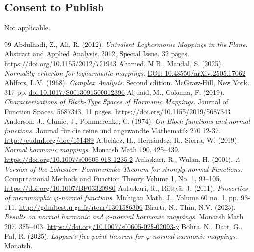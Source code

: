 \documentclass[11pt, reqno]{amsart}
\theoremstyle{definition}
\theoremstyle{remark}
\numberwithin{equation}{section}
\begin{document}
\subsection*{Consent to Publish} Not applicable.

\begin{thebibliography}{99}
 \label{abdulhadi-ulmitp-2012} Abdulhadi, Z., Ali, R. (2012). \textit{Univalent Logharmonic Mappings in the Plane}. Abstract and Applied Analysis. 2012, Special Issue. 32 pages. \url{https://doi.org/10.1155/2012/721943}
 \label{ahamed-ncflm-2025} Ahamed, M.B., Mandal, S. (2025). \textit{Normality criterion for logharmonic mappings}. \url{DOI: 10.48550/arXiv.2505.17062}
 \label{ahlfors-ca-1968} Ahlfors, L.V. (1968). \textit{Complex Analysis}. Second edition. McGraw-Hill, New York. 317 pp. \url{doi:10.1017/S0013091500012396}
 \label{aljuain-cobtsohm-2019} Aljuaid, M., Colonna, F. (2019). \textit{Characterizations of Bloch-Type Spaces of Harmonic Mappings}. Journal of Function Spaces. 5687343, 11 pages. \url{https://doi.org/10.1155/2019/5687343}
 \label{anderson-obfanf-1974} Anderson, J., Clunie, J., Pommerenke, C. (1974). \textit{On Bloch functions and normal functions.} Journal für die reine und angewandte Mathematik 270 12-37. \url{http://eudml.org/doc/151489}
 \label{arbelaez-nhm-2019} Arbeláez, H., Hernández, R., Sierra, W. (2019). \textit{Normal harmonic mappings}. Monatsh Math 190, 425–439. \url{https://doi.org/10.1007/s00605-018-1235-2}
 \label{aulaskari-avotlptfsnf-2001} Aulaskari, R., Wulan, H. (2001). \textit{A Version of the Lohwater\,-\,Pommerenke Theorem for strongly-normal Functions}. Computational Methods and Function Theory Volume 1, No. 1, 99–105. \url{https://doi.org/10.1007/BF03320980}
 \label{aulaskari-pompnf-2011} Aulaskari, R., Rättyä, J. (2011). \textit{Properties of meromorphic $\varphi$-normal functions}. Michigan Math. J., Volume 60 no. 1, pp. 93-111. \url{http://gdmltest.u-ga.fr/item/1301586306}
 \label{bharti-ronhapnhm-2025} Bharti, N., Thin, N.V. (2025). \textit{Results on normal harmonic and 
$\varphi$-normal harmonic mappings}. Monatsh Math 207, 385–403. \url{https://doi.org/10.1007/s00605-025-02093-y}
 \label{bohra-lfptfpnhm-2025} Bohra, N., Datt, G., Pal, R. (2025). \textit{Lappan’s five-point theorem for $\varphi$-normal harmonic mappings}. Monatsh.

\end{thebibliography}
\end{document}
